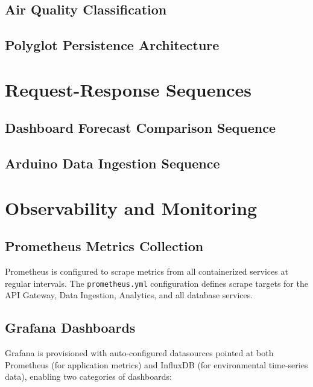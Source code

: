 \figMethodologyKafkaBridge

\subsection{Air Quality Classification}

\tabMethodologyAqi

\subsection{Polyglot Persistence Architecture}

\tabMethodologyPolyglot

\section{Request-Response Sequences}

\subsection{Dashboard Forecast Comparison Sequence}

\figMethodologySequence

\subsection{Arduino Data Ingestion Sequence}

\figMethodologySeqIngest

\section{Observability and Monitoring}

\subsection{Prometheus Metrics Collection}
Prometheus is configured to scrape metrics from all containerized services at regular intervals. The \texttt{prometheus.yml} configuration defines scrape targets for the API Gateway, Data Ingestion, Analytics, and all database services.

\subsection{Grafana Dashboards}
Grafana is provisioned with auto-configured datasources pointed at both Prometheus (for application metrics) and InfluxDB (for environmental time-series data), enabling two categories of dashboards:

